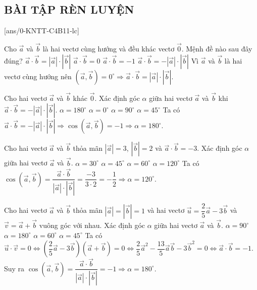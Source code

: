 \subsection{BÀI TẬP RÈN LUYỆN}
 
\setcounter{ex}{0}
[ans/0-KNTT-C4B11-lc]
\begin{ex}%
	Cho $\vec{a}$ và $\vec{b}$ là hai vectơ cùng hướng và đều khác vectơ $\vec{0}$. Mệnh đề nào sau đây đúng?
	\choice
	{\True $\vec{a}\cdot \vec{b}=\left|\vec{a}\right|\cdot \left|\vec{b}\right|$}
	{$\vec{a}\cdot \vec{b}=0$}
	{$\vec{a}\cdot \vec{b}=-1$}
	{$\vec{a}\cdot \vec{b}=-|\vec{a}|\cdot |\vec{b}|$}
	\loigiai
	{
	Vì $\vec{a}$ và $\vec{b}$ là hai vectơ cùng hướng nên $(\vec{a},\vec{b})=0^\circ\Rightarrow \vec{a}\cdot \vec{b}=\left|\vec{a}\right|\cdot \left|\vec{b}\right|.$
	}
\end{ex}
\begin{ex}%
	Cho hai vectơ $\vec{a}$ và $\vec{b}$ khác $\vec{0}$. Xác định góc $\alpha$ giữa hai vectơ $\vec{a}$ và $\vec{b}$ khi $\vec{a}\cdot \vec{b}=-\left|\vec{a}\right|\cdot \left|\vec{b}\right|$.
	\choice
	{\True $\alpha=180^\circ$}
	{$\alpha=0^\circ$}
	{$\alpha=90^\circ$}
	{$\alpha=45^\circ$}
	\loigiai
	{
	Ta có 	$\vec{a}\cdot \vec{b}=-\left|\vec{a}\right|\cdot \left|\vec{b}\right|\Rightarrow \cos\left(\vec{a},\vec{b}\right)=-1\Rightarrow \alpha=180^\circ$.
	}
\end{ex}
\begin{ex}%
	Cho hai vectơ $\vec{a}$ và $\vec{b}$ thỏa mãn $\left|\vec{a}\right|=3$, $\left|\vec{b}\right|=2$ và $\vec{a}\cdot \vec{b}=-3$. Xác định góc $\alpha$ giữa hai vectơ $\vec{a}$ và $\vec{b}$.
	\choice
	{$\alpha=30^\circ$}
	{$\alpha=45^\circ$}
	{$\alpha=60^\circ$}
	{\True $\alpha=120^\circ$}
	\loigiai
	{
	Ta có $\cos\left(\vec{a},\vec{b}\right)=\dfrac{\vec{a}\cdot\vec{b}}{\left|\vec{a}\right|\cdot \left|\vec{b}\right|}=\dfrac{-3}{3\cdot 2}=-\dfrac{1}{2}\Rightarrow \alpha=120^\circ$.
	}
\end{ex}
\begin{ex}%
	Cho hai vectơ $\vec{a}$ và $\vec{b}$ thỏa mãn $\left|\vec{a}\right|=\left|\vec{b}\right|=1$ và hai vectơ $\vec{u}=\dfrac{2}{5}\vec{a}-3\vec{b}$ và $\vec{v}=\vec{a}+\vec{b}$ vuông góc với nhau. Xác định góc $\alpha$ giữa hai vectơ $\vec{a}$ và $\vec{b}$.
	\choice
	{$\alpha=90^\circ$}
	{\True $\alpha=180^\circ$}
	{$\alpha=60^\circ$}
	{$\alpha=45^\circ$}
	\loigiai
	{
	Ta có $\vec{u}\cdot \vec{v}=0\Leftrightarrow \left(\dfrac{2}{5}\vec{a}-3\vec{b}\right)\left(\vec{a}+\vec{b}\right)=0\Leftrightarrow \dfrac{2}{5}\vec{a}^2-\dfrac{13}{5}\vec{a}\vec{b}-3\vec{b}^2=0\Leftrightarrow \vec{a}\cdot \vec{b}=-1$.\\
	Suy ra $\cos\left(\vec{a},\vec{b}\right)=\dfrac{\vec{a}\cdot\vec{b}}{\left|\vec{a}\right|\cdot \left|\vec{b}\right|}=-1\Rightarrow \alpha=180^\circ$.
	}
\end{ex}
